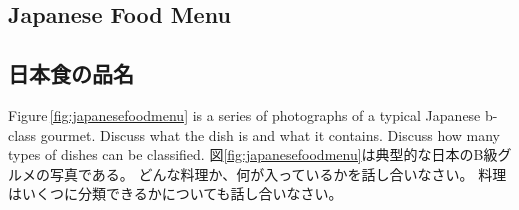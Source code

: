 \documentclass[uplatex,dvipdfmx,b5paper,english,10pt]{jsbook}
\begin{document}

\ifEnglish
\subsection{Japanese Food Menu}
\else
\subsection{日本食の品名}
\fi

\begin{toiquestion}
\ifEnglish
Figure\,\ref{fig:japanesefoodmenu} is a series of photographs of a typical Japanese b-class gourmet.
Discuss what the dish is and what it contains.
Discuss how many types of dishes can be classified.
\else
図\ref{fig:japanesefoodmenu}は典型的な日本のB級グルメの写真である。
どんな料理か、何が入っているかを話し合いなさい。
料理はいくつに分類できるかについても話し合いなさい。
\fi
\end{toiquestion}
\end{document}
